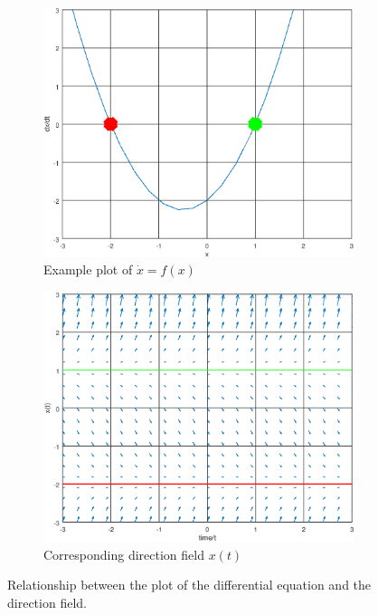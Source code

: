  \begin{figure}[H]
	\centering
	\begin{subfigure}[h]{0.45\linewidth}
		\includegraphics[width=\linewidth]{images/xPrime_x.png}
		\caption{Example plot of $\dot{x} = f(x)$}
		\label{fig:xPrime_x}
	\end{subfigure}
	\begin{subfigure}[h]{0.45\linewidth}
		\includegraphics[width=\linewidth]{images/x_t_quiver.png}
		\caption{Corresponding direction field $x(t)$}
		\label{fig:x_t_quiver}
	\end{subfigure}
	\caption{Relationship between the plot of the differential equation and the direction field.}
\end{figure}

